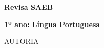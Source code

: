               \vspace*{\fill}
              \begin{center}
              {\HUGE\textbf{Revisa SAEB}}\bigskip

              {\LARGE\textbf{1º ano: Língua Portuguesa}}

              \bigskip
              \bigskip
              \bigskip

              {\Large
                            AUTORIA

                            }
              \end{center}
              \vspace*{\fill}

\endgroup
\pagebreak